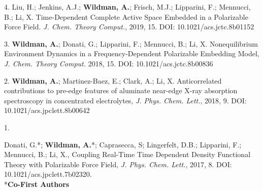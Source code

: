 


\begin{cvpublications}


\cvpublication
{4.} 
{Liu, H.; Jenkins, A.J.; \textbf{Wildman, A.}; Frisch, M.J.; Lipparini, F.; Mennucci,
B.; Li, X. Time-Dependent Complete Active Space Embedded in a Polarizable Force
Field.  \textit{J. Chem. Theory Comput.}, 2019, 15. DOI:
10.1021/acs.jctc.8b01152} 


\cvpublication
{3.} 
{\textbf{Wildman, A.}; Donati, G.; Lipparini, F.; Mennucci, B.; Li, X.
Nonequilibrium Environment Dynamics in a Frequency-Dependent Polarizable
Embedding Model, \textit{J. Chem. Theory Comput.} 2018, 15. DOI:
10.1021/acs.jctc.8b00836} 


\cvpublication
{2.} 
{\textbf{Wildman, A.}; Martinez-Baez, E.; Clark, A.; Li, X. Anticorrelated
contributions to pre-edge features of aluminate near-edge X-ray absorption
spectroscopy in concentrated electrolytes, \textit{J. Phys. Chem. Lett.},
2018, 9. DOI: 10.1021/acs.jpclett.8b00642} 


\cvpublication
{1.}
{\parbox[t]{0.95\textwidth}{\strut Donati, G.*; \textbf{Wildman, A.}*; Caprasecca, S; Lingerfelt, D.B.; Lipparini,
F.; Mennucci, B.; Li, X., Coupling Real-Time Time Dependent Density Functional
Theory with Polarizable Force Field, \textit{J. Phys. Chem. Lett.}, 2017, 8.
DOI: 10.1021/acs.jpclett.7b02320. \\ \**\textbf{Co-First Authors}}}



\end{cvpublications}
\vspace{-1cm}

